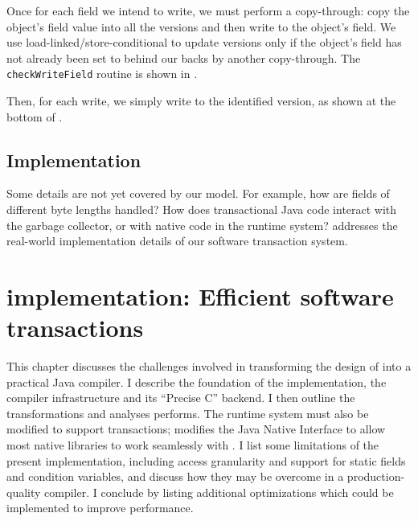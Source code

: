 Once for each field we intend to write, we must perform a
copy-through: copy the object's field value into all the versions and
then write \FLAG to the object's field.  We use
load-linked/store-conditional to update versions only if the object's
field has not already been set to \FLAG behind our backs by another
copy-through.  The {\tt checkWriteField} routine is shown in
.

Then, for each write, we simply write to the identified version, as
shown at the bottom of .

\section*{Implementation}
Some details are not yet covered by our model.
For example, how are fields of different byte lengths handled?  How does
transactional Java code interact with the garbage collector, or with
native code in the runtime system?   addresses the
real-world
implementation details of our software transaction system.

\chapter{\apex implementation: Efficient software transactions}\label{cha:stmimpl}

This chapter discusses the challenges involved in transforming the
design of  into a practical Java compiler.  I describe the
foundation of the implementation, the \flex compiler infrastructure
and its ``Precise C'' backend.  I then outline the transformations and
analyses \flex performs.  The runtime system must also be modified to
support transactions; \flex modifies the Java Native Interface to
allow most native libraries to work seamlessly with \apex.  I list
some limitations of the present implementation, including access
granularity and support for static fields and condition variables, and
discuss how they may be overcome in a production-quality compiler.
I conclude by listing additional optimizations which could be
implemented to improve \apex performance.

